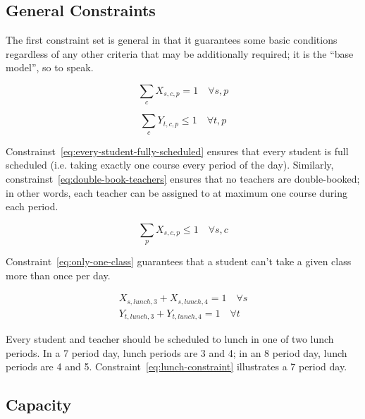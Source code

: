 \documentclass[12pt]{article}
\begin{document}
\subsection{General Constraints}

The first constraint set is general in that it guarantees some basic conditions regardless of any other criteria that may be additionally required; it is the ``base model'', so to speak.

\begin{equation} \label{eq:every-student-fully-scheduled}
	\displaystyle \sum_{c} X_{s,c,p} = 1 \quad \forall s,p
\end{equation}

\begin{equation} \label{eq:double-book-teachers}
	\displaystyle \sum_{c} Y_{t,c,p} \leq 1 \quad \forall t,p
\end{equation}

Constrainst~\ref{eq:every-student-fully-scheduled} ensures that every student is full scheduled (i.e. taking exactly one course every period of the day). Similarly, constrainst~\ref{eq:double-book-teachers} ensures that no teachers are double-booked; in other words, each teacher can be assigned to at maximum one course during each period.

\begin{equation} \label{eq:only-one-class}
	\displaystyle \sum_{p} X_{s,c,p} \leq 1 \quad \forall s,c
\end{equation}

Constraint~\ref{eq:only-one-class} guarantees that a student can't take a given class more than once per day.

\begin{equation} \label{eq:lunch-constraint}
\begin{split}
	X_{s,lunch,3} + X_{s,lunch,4} = 1 \quad \forall s \\
	Y_{t,lunch,3} + Y_{t,lunch,4} = 1 \quad \forall t
\end{split}
\end{equation}

Every student and teacher should be scheduled to lunch in one of two lunch periods. In a 7 period day, lunch periods are 3 and 4; in an 8 period day, lunch periods are 4 and 5. Constraint~\ref{eq:lunch-constraint} illustrates a 7 period day.


\subsection{Capacity}
\end{document}
